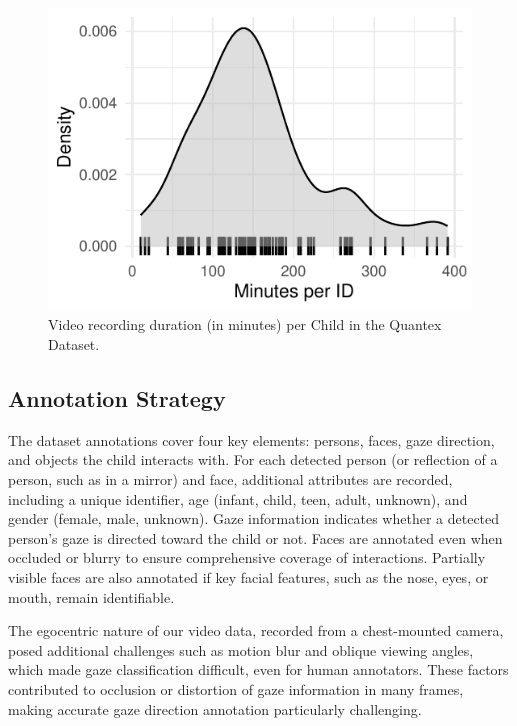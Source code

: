 \documentclass[
  man,floatsintext]{apa6}
\begin{document}
\begin{figure}

{\centering \includegraphics{Quantex_interaction_paper_files/figure-latex/quantex-minutes-per-child-1} 

}

\caption{Video recording duration (in minutes) per Child in the Quantex Dataset.}\label{fig:quantex-minutes-per-child}
\end{figure}

\subsection{Annotation Strategy}\label{annotation-strategy}

The dataset annotations cover four key elements: persons, faces, gaze direction, and objects the child interacts with. For each detected person (or reflection of a person, such as in a mirror) and face, additional attributes are recorded, including a unique identifier, age (infant, child, teen, adult, unknown), and gender (female, male, unknown). Gaze information indicates whether a detected person's gaze is directed toward the child or not. Faces are annotated even when occluded or blurry to ensure comprehensive coverage of interactions. Partially visible faces are also annotated if key facial features, such as the nose, eyes, or mouth, remain identifiable.

The egocentric nature of our video data, recorded from a chest-mounted camera, posed additional challenges such as motion blur and oblique viewing angles, which made gaze classification difficult, even for human annotators. These factors contributed to occlusion or distortion of gaze information in many frames, making accurate gaze direction annotation particularly challenging.
\end{document}
